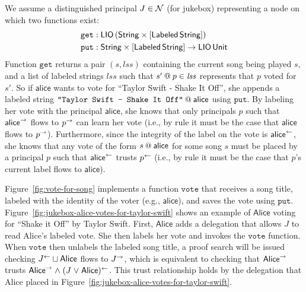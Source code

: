 We assume a distinguished principal $J \in \Nameset$ (for jukebox) representing a node on which two functions exist:
\begin{align*}
\mathtt{get}&: \liotype{(\pair{\String}{\listtype{\labeled{\String}}})}\\
\mathtt{put}&: \pair{\String}{\listtype{\labeled{\String}}} \to \liotype{\unit}
\end{align*}
Function $\mathtt{get}$ returns a pair $(\mathit{s}, \mathit{lss})$ containing the current song being played $s$, and a list of labeled strings $\mathit{lss}$ such that $\lb{p}{s'} \in \mathit{lss}$ represents that $p$ voted for $s'$. So if $\mathsf{alice}$ wants to vote for ``Taylor Swift - Shake It Off'', she appends a labeled string $\lb{\mathsf{alice}}{\texttt{"Taylor Swift - Shake It Off"}}$ using $\mathtt{put}$. By labeling her vote with the principal $\mathsf{alice}$, she knows that only principals $p$ such that $\conf{\mathsf{alice}}$ flows to $\conf{p}$ can learn her vote (i.e., by rule  it must be the case that $\mathsf{alice}$ flows to $\conf{p}$). Furthermore, since the integrity of the label on the vote is $\integ{\mathsf{alice}}$, she knows that any vote of the form $\lb{\mathsf{alice}}{s}$ for some song $s$ must be placed by a principal $p$ such that $\integ{\mathsf{alice}}$ trusts $\integ{p}$ (i.e., by rule  it must be the case that $p$'s current label flows to $\mathsf{alice}$).

Figure~\ref{fig:vote-for-song} implements a function $\mathtt{vote}$ that receives a song title, labeled with the identity of the voter (e.g., $\mathsf{alice}$), and saves the vote using $\mathtt{put}$. Figure~\ref{fig:jukebox-alice-votes-for-taylor-swift} shows an example of $\mathsf{Alice}$ voting for ``Shake it Off'' by Taylor Swift. First, $\mathsf{Alice}$ adds a delegation that allows $J$ to read Alice's labeled vote. She then labels her vote and invokes the $\mathtt{vote}$ function. When $\mathtt{vote}$ then unlabels the labeled song title, a proof search will be issued checking $\integ{J} \join \mathsf{Alice}$ flows to $\conf{J}$, which is equivalent to checking that $\conf{\mathsf{Alice}}$ trusts $\conf{\mathsf{Alice}} \conj \integ{(J \disj \mathsf{Alice})}$. This trust relationship holds by the delegation that Alice placed in Figure~\ref{fig:jukebox-alice-votes-for-taylor-swift}.

